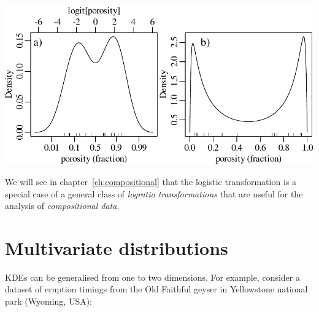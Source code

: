 \noindent\begin{minipage}[t][][b]{.6\textwidth}
  \includegraphics[width=\textwidth]{../figures/logitKDE.pdf}\medskip
\end{minipage}
\begin{minipage}[t][][t]{.4\textwidth}
  \label{fig:logitKDE}
\end{minipage}

We will see in chapter~\ref{ch:compositional} that the logistic
transformation is a special case of a general class of \emph{logratio
  transformations} that are useful for the analysis of
\emph{compositional data}.

\section{Multivariate distributions}
\label{sec:multivariate}

KDEs can be generalised from one to two dimensions.  For example,
consider a dataset of eruption timings from the Old Faithful geyser in
Yellowstone national park (Wyoming, USA): \medskip

